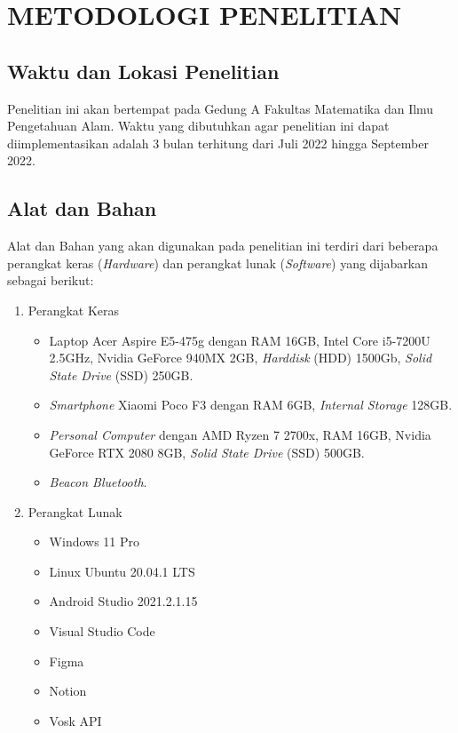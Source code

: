 \fancyhf{} 
\fancyfoot[C]{\thepage}
\chapter{METODOLOGI PENELITIAN}

\section{Waktu dan Lokasi Penelitian}
Penelitian ini akan bertempat pada Gedung A Fakultas Matematika dan Ilmu Pengetahuan Alam. Waktu yang dibutuhkan agar penelitian ini dapat diimplementasikan adalah 3 bulan terhitung dari Juli 2022 hingga September 2022.

\section{Alat dan Bahan}
Alat dan Bahan yang akan digunakan pada penelitian ini terdiri dari beberapa perangkat keras (\textit{Hardware}) dan perangkat lunak (\textit{Software}) yang dijabarkan sebagai berikut:

\begin{enumerate}
\item Perangkat Keras
	\begin{itemize}
	\item Laptop Acer Aspire E5-475g dengan RAM 16GB, Intel Core i5-7200U 2.5GHz, Nvidia GeForce 940MX 2GB, \textit{Harddisk} (HDD) 1500Gb, \textit{Solid State Drive} (SSD) 250GB.
	\item \textit{Smartphone} Xiaomi Poco F3 dengan RAM 6GB, \textit{Internal Storage} 128GB.
	\item \textit{Personal Computer} dengan AMD Ryzen 7 2700x, RAM 16GB, Nvidia GeForce RTX 2080 8GB, \textit{Solid State Drive} (SSD) 500GB.
	\item \textit{Beacon Bluetooth}.
	\end{itemize}

\item Perangkat Lunak
	\begin{itemize}
	\item Windows 11 Pro
	\item Linux Ubuntu 20.04.1 LTS
	\item Android Studio 2021.2.1.15
	\item Visual Studio Code
	\item Figma
	\item Notion
	\item Vosk API
	
	\end{itemize}
\end{enumerate}


